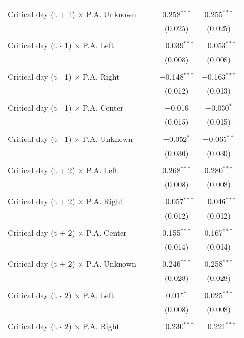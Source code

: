 \documentclass[
]{article}
\begin{document}
\begin{table}[!htbp]
{\begin{tabular}{@{\extracolsep{5pt}}lcccc}
  & & & & \\ 
 Critical day (t + 1) $\times$ P.A. Unknown &  &  & 0.258$^{***}$ & 0.255$^{***}$ \\ 
  &  &  & (0.025) & (0.025) \\ 
  & & & & \\ 
 Critical day (t - 1) $\times$ P.A. Left &  &  & $-$0.039$^{***}$ & $-$0.053$^{***}$ \\ 
  &  &  & (0.008) & (0.008) \\ 
  & & & & \\ 
 Critical day (t - 1) $\times$ P.A. Right &  &  & $-$0.148$^{***}$ & $-$0.163$^{***}$ \\ 
  &  &  & (0.012) & (0.013) \\ 
  & & & & \\ 
 Critical day (t - 1) $\times$ P.A. Center &  &  & $-$0.016 & $-$0.030$^{*}$ \\ 
  &  &  & (0.015) & (0.015) \\ 
  & & & & \\ 
 Critical day (t - 1) $\times$ P.A. Unknown &  &  & $-$0.052$^{*}$ & $-$0.065$^{**}$ \\ 
  &  &  & (0.030) & (0.030) \\ 
  & & & & \\ 
 Critical day (t + 2) $\times$ P.A. Left &  &  & 0.268$^{***}$ & 0.280$^{***}$ \\ 
  &  &  & (0.008) & (0.008) \\ 
  & & & & \\ 
 Critical day (t + 2) $\times$ P.A. Right &  &  & $-$0.057$^{***}$ & $-$0.046$^{***}$ \\ 
  &  &  & (0.012) & (0.012) \\ 
  & & & & \\ 
 Critical day (t + 2) $\times$ P.A. Center &  &  & 0.155$^{***}$ & 0.167$^{***}$ \\ 
  &  &  & (0.014) & (0.014) \\ 
  & & & & \\ 
 Critical day (t + 2) $\times$ P.A. Unknown &  &  & 0.246$^{***}$ & 0.258$^{***}$ \\ 
  &  &  & (0.028) & (0.028) \\ 
  & & & & \\ 
 Critical day (t - 2) $\times$ P.A. Left &  &  & 0.015$^{*}$ & 0.025$^{***}$ \\ 
  &  &  & (0.008) & (0.008) \\ 
  & & & & \\ 
 Critical day (t - 2) $\times$ P.A. Right &  &  & $-$0.230$^{***}$ & $-$0.221$^{***}$ \\ 

\end{tabular}}
\end{table}
\end{document}
